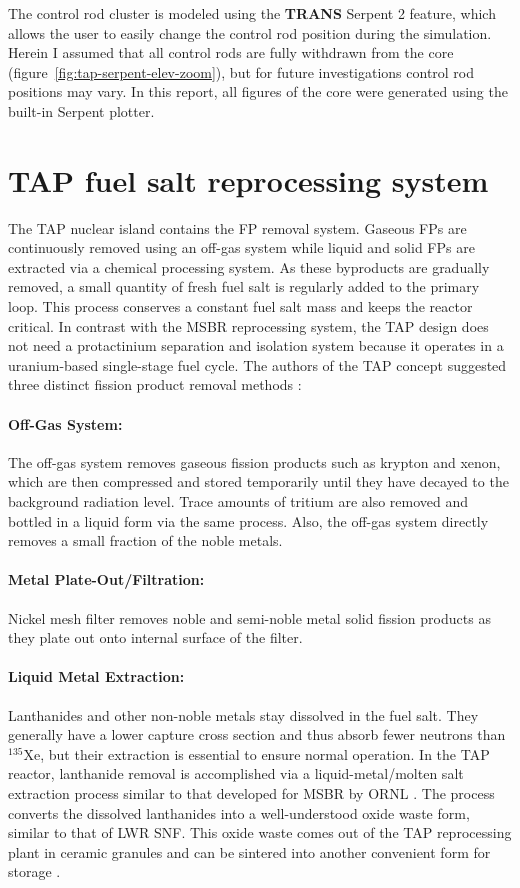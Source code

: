 The control rod cluster is modeled using the \textbf{TRANS} Serpent 2 feature, 
which allows the user to easily change the control rod position during the 
simulation. Herein I assumed that all control rods are fully withdrawn from 
the core (figure~\ref{fig:tap-serpent-elev-zoom}), but for future 
investigations control rod positions may vary. In this report, all figures of 
the core were generated using the built-in Serpent plotter.

\section{TAP fuel salt reprocessing system}
The \gls{TAP} nuclear island contains the \gls{FP} removal system. Gaseous  
\glspl{FP} are continuously removed using an off-gas system while liquid and 
solid \glspl{FP} are extracted via a chemical processing system. As these 
byproducts are gradually removed, a small quantity of fresh fuel salt is 
regularly added to the primary loop. This process conserves a constant fuel 
salt mass and keeps the reactor critical. In contrast with the \gls{MSBR} 
reprocessing system, the \gls{TAP} design does not need a protactinium 
separation and isolation system because it operates in a uranium-based 
single-stage fuel cycle. The authors of the \gls{TAP} concept suggested three 
distinct fission product removal methods 
\cite{transatomic_power_corporation_neutronics_2016}:
\paragraph{Off-Gas System:} The off-gas system removes gaseous fission 
products such as krypton and xenon, which are then compressed and stored 
temporarily until they have decayed to the background radiation level. Trace 
amounts of tritium are also removed and bottled in a liquid form via the same 
process. Also, the off-gas system directly removes a small fraction of the 
noble metals.
\paragraph{Metal Plate-Out/Filtration:} Nickel mesh filter removes noble and 
semi-noble metal solid fission products as they plate out onto internal surface
of the filter.
\paragraph{Liquid Metal Extraction:} Lanthanides and other non-noble metals 
stay dissolved in the fuel salt. They generally have a lower capture cross 
section and thus absorb fewer neutrons than $^{135}$Xe, but their extraction 
is essential to ensure normal operation. In the \gls{TAP} reactor, lanthanide 
removal is accomplished via a liquid-metal/molten salt extraction process 
similar to that developed for \gls{MSBR} by \gls{ORNL}  
\cite{robertson_conceptual_1971}. The process converts the dissolved 
lanthanides into a well-understood oxide waste form, similar to that of 
\gls{LWR} \gls{SNF}. This oxide waste comes out of the \gls{TAP} reprocessing 
plant in ceramic granules and can be sintered into another convenient form for 
storage \cite{transatomic_power_corporation_technical_2016}.

